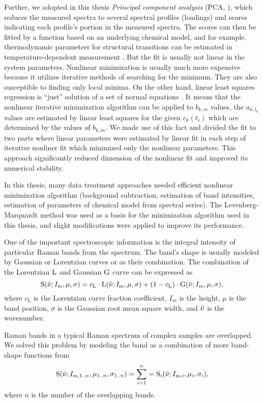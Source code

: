 Further, we adopted in this thesis \emph{Principal component analysis} (PCA,
\cite{%
	Wold1987,%
	Malinowski2002%
}),
which reduces the measured spectra to several spectral profiles (loadings) and
scores indicating each profile's portion in the measured spectra.
The scores can then be fitted by a function based on an underlying chemical
model, and for example, thermodynamic parameters for structural transitions
can be estimated in temperature-dependent measurement
\parencite{Nemecek2013}.
But the fit is usually not linear in the system parameters.
Nonlinear minimization is usually much more expensive because it utilizes
iterative methods of searching for the minimum.
They are also susceptible to finding only local minima.
On the other hand, linear least squares regression is “just” solution of a set
of normal equations
\parencite[p.~671]{NumericalRecipes}.
It means that the nonlinear iterative minimization algorithm can be applied
to $b_{k,m}$ values, the $a_{k,l_k}$ values are estimated by linear least
squares for the given $c_k(t_i)$ which are determined by the values of
$b_{k,m}$.
We made use of this fact and divided the fit to two parts where linear
parameters were estimated by linear fit in each step of iterative nonliner
fit which minimized only the nonlinear parameters.
This approach significantly reduced dimension of the nonlinear fit and
improved its numerical stability.

In this thesis, many data treatment approaches needed efficient nonlinear
minimization algorithm (background subtraction, estimation of band intensities,
estimation of parameters of chemical model from spectral series).
The Levenberg-Marquardt method
\parencite{Marquardt1963}
was used as a basis for the minimization algorithm used in this thesis, and
slight modifications were applied to improve its performance.

\label{band_intensities}

One of the important spectroscopic information is the integral intensity of
particular Raman bands from the spectrum.
The band's shape is usually modeled by Gaussian or Lorentzian curves or as
their combination.
The combination of the Lorentzian $\operatorname{L}$ and Gaussian $\operatorname{G}$ curve can
be expressed as
\begin{equation}
	\func{S}(\wn; I_\text{m}, \mu, \sigma) =
		c_\text{L} \cdot \func{L}(\wn; I_\text{m}, \mu, \sigma)
		+ (1 - c_\text{L}) \cdot \func{G}(\wn; I_\text{m}, \mu, \sigma),
	\label{\eqnlabel{band_intensities:single_shape}}
\end{equation}
where $c_\text{L}$ is the Lorentzian curve fraction coefficient, $I_m$ is the
height, $\mu$ is the band position, $\sigma$ is the Gaussian root mean square
width, and $\tilde{\nu}$ is the wavenumber.

Raman bands in a typical Raman spectrum of complex samples are overlapped.
We solved this problem by modeling the band as a combination of more
band-shape functions from
\begin{equation}
	\func{S}(\wn; I_{\text{m},1..n}, \mu_{1..n}, \sigma_{1..n}) =
		\sum_{i = 1}^n = 	\func{S}_i(\wn; I_{\text{m},i}, \mu_i, \sigma_i),
	\label{\eqnlabel{band_intensities:shape}}
\end{equation}
where $n$ is the number of the overlapping bands.
